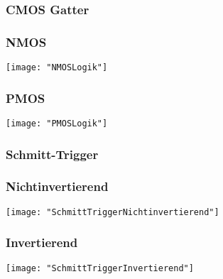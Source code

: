 \subsubsection{CMOS Gatter}
\begin{minipage}[t]{0.45\textwidth}
	\vspace{0pt}								%
	\subsubsection{NMOS}
	\texttt{[image: "NMOSLogik"]}
\end{minipage}\hspace{0.05\textwidth}
\begin{minipage}[t]{0.45\textwidth}
	\vspace{0pt}								%
	\subsubsection{PMOS}
	\texttt{[image: "PMOSLogik"]}
\end{minipage}
\vspace{2mm}


\subsubsection{Schmitt-Trigger}
\begin{minipage}[t]{0.45\textwidth}
	\vspace{0pt}								%
	\subsubsection{Nichtinvertierend}
	\texttt{[image: "SchmittTriggerNichtinvertierend"]}
\end{minipage}\hspace{0.05\textwidth}
\begin{minipage}[t]{0.45\textwidth}
	\vspace{0pt}								%
	\subsubsection{Invertierend}
	\texttt{[image: "SchmittTriggerInvertierend"]}
\end{minipage}
\vspace{2mm}


